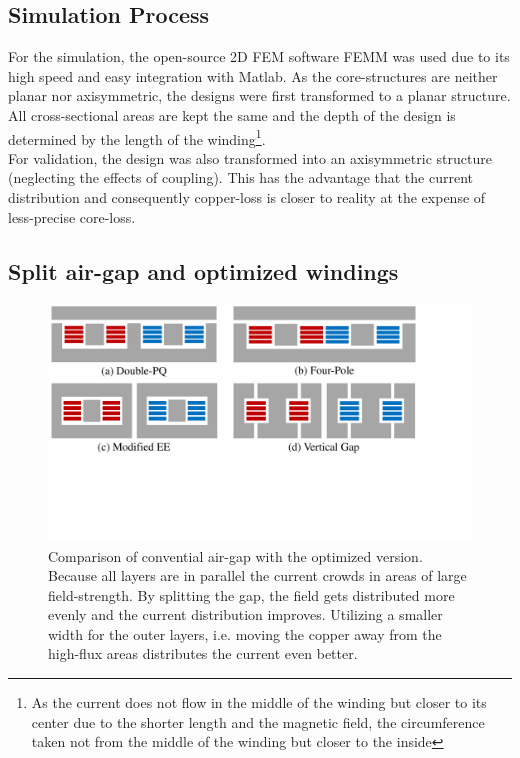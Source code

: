 \documentclass{IPEC2026}
\begin{document}
\subsection{Simulation Process}
For the simulation, the open-source 2D FEM software FEMM was used due to its high speed and easy integration with Matlab. As the core-structures are neither planar nor axisymmetric, the designs were first transformed to a planar structure. All cross-sectional areas are kept the same and the depth of the design is determined by the length of the winding\footnote{As the current does not flow in the middle of the winding but closer to its center due to the shorter length and the magnetic field, the circumference taken not from the middle of the winding but closer to the inside}. \\
For validation, the design was also transformed into an axisymmetric structure (neglecting the effects of coupling). This has the advantage that the current distribution and consequently copper-loss is closer to reality at the expense of less-precise core-loss.

\subsection{Split air-gap and optimized windings}
\begin{figure}
  \includegraphics[page=2, trim = 0cm 7cm 13cm 0cm, clip, width=\columnwidth]{figures/IPEC_Figures_PowerPoint.pdf}
  \caption{Comparison of convential air-gap with the optimized version. Because all layers are in parallel the current crowds in areas of large field-strength. By splitting the gap, the field gets distributed more evenly and the current distribution improves. Utilizing a smaller width for the outer layers, i.e. moving the copper away from the high-flux areas distributes the current even better.}
  \label{fig:Core_Drawings}
\end{figure}
\end{document}
